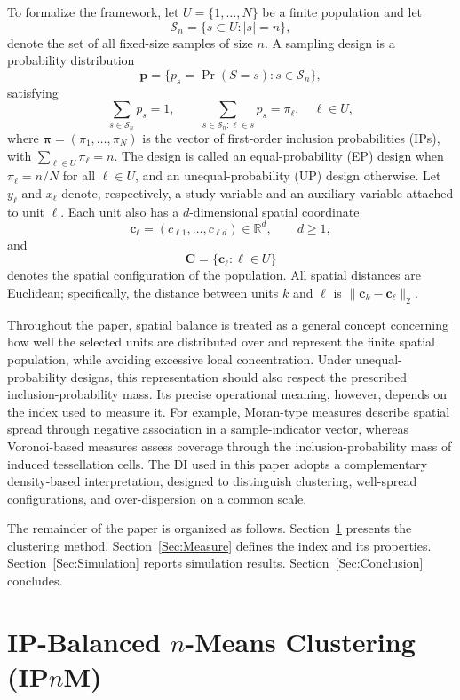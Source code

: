 \documentclass[12pt]{imsart}
\theoremstyle{plain}
\theoremstyle{remark}
\begin{document}
To formalize the framework, let \(U=\{1,\ldots,N\}\) be a finite
population and let \[\mathcal S_n=\{s\subset U: |s|=n\},\] denote the
set of all fixed-size samples of size \(n\). A sampling design is a
probability distribution
\[
\bm p=\{p_s=\Pr(S=s):s\in\mathcal S_n\},
\]
satisfying
\[
\sum_{s\in\mathcal S_n}p_s=1,
\qquad
\sum_{s\in\mathcal S_n:\ell\in s}p_s=\pi_\ell,\quad \ell\in U,
\]
where \(\bm\pi=(\pi_1,\ldots,\pi_N)\) is the vector of first-order
inclusion probabilities (IPs), with \(\sum_{\ell\in U}\pi_\ell=n\). The design
is called an equal-probability (EP) design when
\(\pi_\ell=n/N\) for all \(\ell\in U\), and an unequal-probability (UP)
design otherwise. Let \(y_\ell\) and \(x_\ell\) denote, respectively, a
study variable and an auxiliary variable attached to unit \(\ell\).
 Each unit also has a \(d\)-dimensional spatial coordinate
\[
\bm c_\ell=(c_{\ell1},\ldots,c_{\ell d})\in\mathbb R^d,
\qquad d\geq1,
\]
and
\[
\bm C=\{\bm c_\ell:\ell\in U\}
\]
denotes the spatial configuration of the population. All spatial distances
are Euclidean; specifically, the distance between units \(k\) and \(\ell\)
is \(\|\bm c_k-\bm c_\ell\|_2\).

 Throughout the paper, spatial balance is treated as a general
concept concerning how well the selected units are distributed over and
represent the finite spatial population, while avoiding excessive local
concentration. Under unequal-probability designs, this representation should
also respect the prescribed inclusion-probability mass. Its precise operational
meaning, however, depends on the index used to measure it. For example,
Moran-type measures describe spatial spread through negative association
in a sample-indicator vector, whereas Voronoi-based measures assess
coverage through the inclusion-probability mass of induced tessellation
cells. The DI used in this paper adopts a complementary density-based
interpretation, designed to distinguish clustering, well-spread
configurations, and over-dispersion on a common scale.

The remainder of the paper is organized as follows. Section~\ref{sec:n-means-balanced} presents the clustering method. Section~\ref{Sec:Measure} defines the index and its properties. Section~\ref{Sec:Simulation} reports simulation results. Section~\ref{Sec:Conclusion} concludes.


\section{IP-Balanced \(n\)-Means Clustering (IP\(n\)M)}
\label{sec:n-means-balanced}
\end{document}
